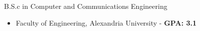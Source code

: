 \begin{scholarship}
					{B.S.c in Computer and Communications Engineering}
					{
                      \begin{itemize}
                            \item Faculty of Engineering, Alexandria University - \textbf{GPA: 3.1}
                      \end{itemize}

                    }

\end{scholarship}